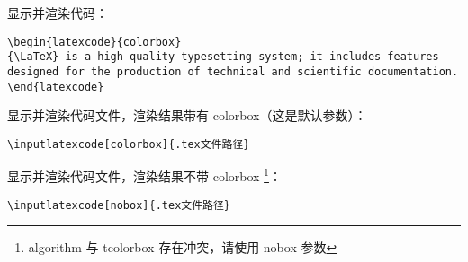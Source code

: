 显示并渲染代码：

\begin{verbatim}
\begin{latexcode}{colorbox}
{\LaTeX} is a high-quality typesetting system; it includes features designed for the production of technical and scientific documentation.
\end{latexcode}
\end{verbatim}

显示并渲染代码文件，渲染结果带有 colorbox（这是默认参数）：

\begin{verbatim}
\inputlatexcode[colorbox]{.tex文件路径}
\end{verbatim}

显示并渲染代码文件，渲染结果不带 colorbox
\footnote{algorithm 与 tcolorbox 存在冲突，请使用 nobox 参数}：

\begin{verbatim}
\inputlatexcode[nobox]{.tex文件路径}
\end{verbatim}



